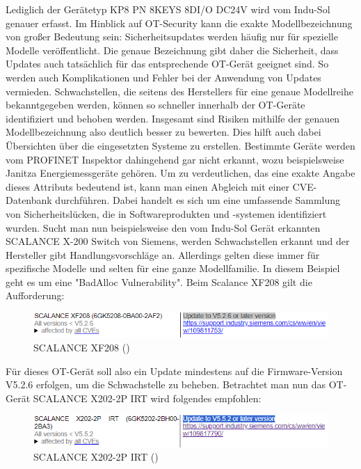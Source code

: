 \noindent Lediglich der Gerätetyp KP8 PN 8KEYS 8DI/O DC24V wird vom Indu-Sol genauer erfasst. Im Hinblick auf OT-Security kann die exakte Modellbezeichnung von großer Bedeutung sein: Sicherheitsupdates werden häufig nur für spezielle Modelle veröffentlicht. Die genaue Bezeichnung gibt daher die Sicherheit, dass Updates auch tatsächlich für das entsprechende OT-Gerät geeignet sind. So werden auch Komplikationen und Fehler bei der Anwendung von Updates vermieden. Schwachstellen, die seitens des Herstellers für eine genaue Modellreihe bekanntgegeben werden, können so schneller innerhalb der OT-Geräte identifiziert und behoben werden. Insgesamt sind Risiken mithilfe der genauen Modellbezeichnung also deutlich besser zu bewerten. Dies hilft auch dabei Übersichten über die eingesetzten Systeme zu erstellen. Bestimmte Geräte werden vom PROFINET Inspektor dahingehend gar nicht erkannt, wozu beispielsweise Janitza Energiemessgeräte gehören. Um zu verdeutlichen, das eine exakte Angabe dieses Attributs bedeutend ist, kann man einen Abgleich mit einer CVE-Datenbank durchführen. Dabei handelt es sich um eine umfassende Sammlung von Sicherheitslücken, die in Softwareprodukten und -systemen identifiziert wurden. Sucht man nun beispielsweise den vom Indu-Sol Gerät erkannten SCALANCE X-200 Switch von Siemens, werden Schwachstellen erkannt und der Hersteller gibt Handlungsvorschläge an. Allerdings gelten diese immer für spezifische Modelle und selten für eine ganze Modellfamilie. In diesem Beispiel geht es um eine "BadAlloc Vulnerability". Beim Scalance XF208 gilt die Aufforderung: 
\smallskip
\begin{figure}[H]
    \centering
    \includegraphics[width=\textwidth]{images/SCALANCEXF208.PNG}
    \caption{SCALANCE XF208 (\cite{SIEMENS1})}
    \label{fig:scalancexf208}
\end{figure}
\smallskip


\clearpage \noindent Für dieses OT-Gerät soll also ein Update mindestens auf die Firmware-Version V5.2.6 erfolgen, um die Schwachstelle zu beheben. Betrachtet man nun das OT-Gerät SCALANCE X202-2P IRT wird folgendes empfohlen:
\smallskip
\begin{figure}[H]
    \centering
    \includegraphics[width=\textwidth]{images/SCALANCEX202-2PIRT.PNG}
    \caption{SCALANCE X202-2P IRT (\cite{SIEMENS1})}
    \label{fig:scalancex2022pirt}
\end{figure}

